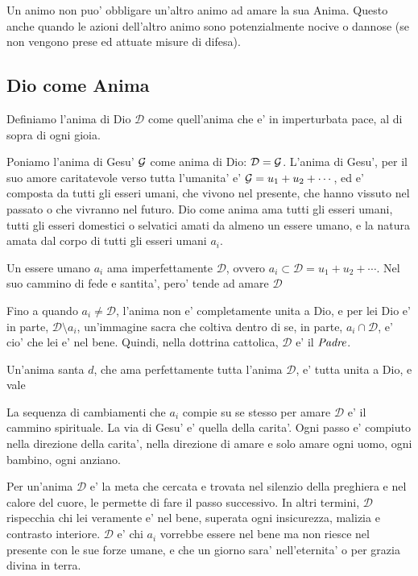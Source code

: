 Un animo non puo' obbligare un'altro animo ad amare la sua Anima. Questo anche quando le azioni dell'altro animo sono potenzialmente nocive o dannose (se non vengono prese ed attuate misure di difesa).


\def\Dio{\mathcal{D}}

\subsection{Dio come Anima}
\label{PureSoulAsGod}
\label{SecondaDefinizioneDio}

Definiamo l'anima di Dio $\Dio$ come quell'anima che e' in imperturbata pace, al di sopra di ogni gioia.

Poniamo l'anima di Gesu' $\mathcal{G}$ come anima di Dio: $\Dio=\anima{G}$. L'anima di Gesu', per il suo amore caritatevole verso tutta l'umanita' e' $\mathcal{G}=u_1+u_2+\cdots$, ed e' composta da tutti gli esseri umani, che vivono nel presente, che hanno vissuto nel passato o che vivranno nel futuro. Dio come anima ama tutti gli esseri umani, tutti gli esseri domestici o selvatici amati da almeno un essere umano, e la natura amata dal corpo di tutti gli esseri umani $a_i$.

Un essere umano $a_i$ ama imperfettamente $\Dio$, ovvero $a_i \subset \Dio=u_1+u_2+\cdots$. Nel suo cammino di fede e santita', pero' tende ad amare $\Dio$

\eal{& \lim a_i = \Dio }

Fino a quando $a_i \ne \Dio$, l'anima non e' completamente unita a Dio, e per lei Dio e' in parte, $\Dio\setminus a_i$, un'immagine sacra che coltiva dentro di se, in parte, $a_i\cap \Dio$, e' cio' che lei e' nel bene. Quindi, nella dottrina cattolica, $\Dio$ e' il $\emph{Padre}$.

Un'anima santa $d$, che ama perfettamente tutta l'anima $\Dio$, e' tutta unita a Dio, e vale 
    \eal{&d=\Dio}

La sequenza di cambiamenti che $a_i$ compie su se stesso per amare $\Dio$ e' il cammino spirituale. La via di Gesu' e' quella  della carita'. Ogni passo e' compiuto nella direzione della carita', nella direzione di amare e solo amare ogni uomo, ogni bambino, ogni anziano.

Per un'anima $\Dio$ e' la meta che cercata e trovata nel silenzio della preghiera e nel calore del cuore, le permette  di fare il passo successivo. In altri termini, $\Dio$ rispecchia chi lei veramente e' nel bene, superata ogni insicurezza, malizia e contrasto interiore. $\Dio$ e' chi $a_i$ vorrebbe essere nel bene ma non riesce nel presente con le sue forze umane, e che un giorno sara' nell'eternita' o per grazia divina in terra.

